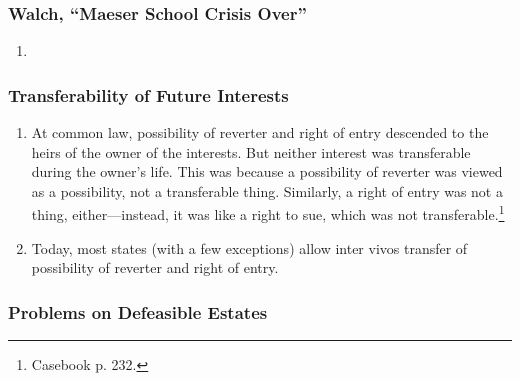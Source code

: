 \subsubsection{Walch, ``Maeser School Crisis Over''}

\begin{enumerate}
    \item %
\end{enumerate}


\subsubsection{Transferability of Future Interests}

\begin{enumerate}
    \item At common law, possibility of reverter and right of entry descended 
    to the heirs of the owner of the interests. But neither interest was 
    transferable during the owner's life. This was because a possibility of 
    reverter was viewed as a possibility, not a transferable thing. Similarly, 
    a right of entry was not a thing, either---instead, it was like a right to 
    sue, which was not transferable.\footnote{Casebook p. 232.}
    \item Today, most states (with a few exceptions) allow inter vivos 
    transfer of possibility of reverter and right of entry.
\end{enumerate}

\subsubsection{Problems on Defeasible Estates}


